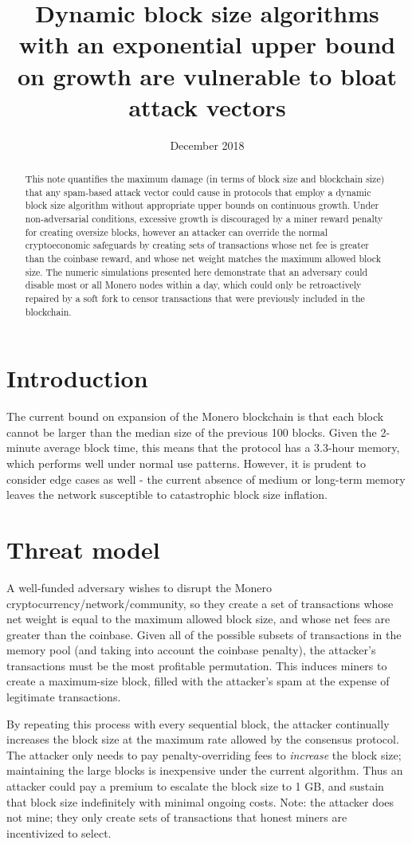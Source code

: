 \documentclass{mrl}
\title{Dynamic block size algorithms with an exponential upper bound on growth are vulnerable to bloat attack vectors}
\date{December 2018}
\begin{document}
\vspace{-0.25cm}
\begin{abstract}
This note quantifies the maximum damage (in terms of block size and blockchain size) that any spam-based attack vector could cause in protocols that employ a dynamic block size algorithm without appropriate upper bounds on continuous growth. Under non-adversarial conditions, excessive growth is discouraged by a miner reward penalty for creating oversize blocks, however an attacker can override the normal cryptoeconomic safeguards by creating sets of transactions whose net fee is greater than the coinbase reward, and whose net weight matches the maximum allowed block size. The numeric simulations presented here demonstrate that an adversary could disable most or all Monero nodes within a day, which could only be retroactively repaired by a soft fork to censor transactions that were previously included in the blockchain.
\end{abstract}

\section{Introduction}
The current bound on expansion of the Monero blockchain is that each block cannot be larger than the median size of the previous 100 blocks. Given the 2-minute average block time, this means that the protocol has a 3.3-hour memory, which performs well under normal use patterns. However, it is prudent to consider edge cases as well - the current absence of medium or long-term memory leaves the network susceptible to catastrophic block size inflation. 

\section{Threat model}
A well-funded adversary wishes to disrupt the Monero cryptocurrency/network/community, so they create a set of transactions whose net weight is equal to the maximum allowed block size, and whose net fees are greater than the coinbase. Given all of the possible subsets of transactions in the memory pool (and taking into account the coinbase penalty), the attacker's transactions must be the most profitable permutation. This induces miners to create a maximum-size block, filled with the attacker's spam at the expense of legitimate transactions.

By repeating this process with every sequential block, the attacker continually increases the block size at the maximum rate allowed by the consensus protocol.  The attacker only needs to pay penalty-overriding fees to \emph{increase} the block size; maintaining the large blocks is inexpensive under the current algorithm. Thus an attacker could pay a premium to escalate the block size to 1 GB, and sustain that block size indefinitely with minimal ongoing costs. Note: the attacker does not mine; they only create sets of transactions that honest miners are incentivized to select. 
\end{document}
